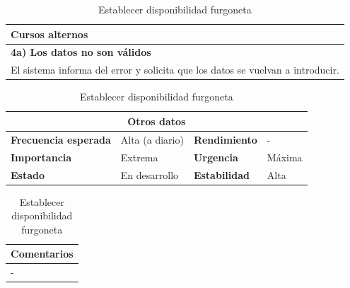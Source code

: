 \documentclass[12pt,spanish]{article}
\begin{document}
\begin{table}[H]
\vspace{1cm}

\begin{tabular}{|m{10pt}|m{7.15cm}|m{10pt}|m{7.15cm}|}
\hline
\multicolumn{4}{|m{16.2cm}|}{\textbf{Cursos alternos}} \\
\hline
\multicolumn{4}{|m{16.2cm}|}{\textbf{4a) Los datos no son válidos}} \\
\hline
\multicolumn{4}{|m{16.2cm}|}{El sistema informa del error y solicita que los datos se vuelvan a introducir.} \\
\hline
\end{tabular}

\vspace{1cm}

\begin{tabular}{|m{3.72cm}|m{3.72cm}|m{3.72cm}|m{3.72cm}|}
\hline
\multicolumn{4}{|c|}{\textbf{Otros datos}} \\
\hline
\textbf{Frecuencia esperada} & Alta (a diario) & \textbf{Rendimiento} & - \\
\hline
\textbf{Importancia} & Extrema & \textbf{Urgencia} & Máxima \\
\hline
\textbf{Estado} & En desarrollo & \textbf{Estabilidad} & Alta \\
\hline
\end{tabular}

\vspace{1cm}

\begin{tabular}{|m{16.2cm}|}
\hline
\textbf{Comentarios} \\
\hline
- \\
\hline
\end{tabular}

\caption{Establecer disponibilidad furgoneta}

\end{table}

\end{document}
